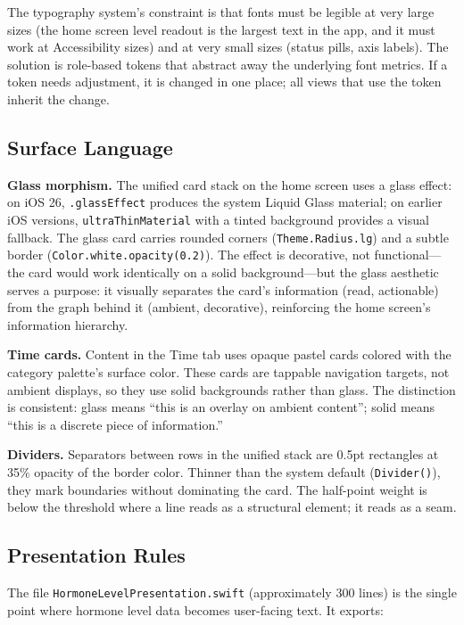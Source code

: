 \documentclass[11pt,a4paper]{article}
\newcommand{\code}[1]{\texttt{\small #1}}
\begin{document}
The typography system's constraint is that fonts must be legible at very
large sizes (the home screen level readout is the largest text in the
app, and it must work at Accessibility sizes) and at very small sizes
(status pills, axis labels). The solution is role-based tokens that
abstract away the underlying font metrics. If a token needs adjustment, it
is changed in one place; all views that use the token inherit the change.

\subsection{Surface Language}
\label{sec:surfaces}

\textbf{Glass morphism.} The unified card stack on the home screen uses a
glass effect: on iOS 26, \code{.glassEffect} produces the system Liquid
Glass material; on earlier iOS versions, \code{ultraThinMaterial} with a
tinted background provides a visual fallback. The glass card carries
rounded corners (\code{Theme.Radius.lg}) and a subtle border
(\code{Color.white.opacity(0.2)}). The effect is decorative, not
functional---the card would work identically on a solid background---but
the glass aesthetic serves a purpose: it visually separates the card's
information (read, actionable) from the graph behind it (ambient,
decorative), reinforcing the home screen's information hierarchy.

\textbf{Time cards.} Content in the Time tab uses opaque pastel cards
colored with the category palette's surface color. These cards are
tappable navigation targets, not ambient displays, so they use solid
backgrounds rather than glass. The distinction is consistent: glass means
``this is an overlay on ambient content''; solid means ``this is a
discrete piece of information.''

\textbf{Dividers.} Separators between rows in the unified stack are
0.5pt rectangles at 35\% opacity of the border color. Thinner than the
system default (\code{Divider()}), they mark boundaries without
dominating the card. The half-point weight is below the threshold where a
line reads as a structural element; it reads as a seam.

\subsection{Presentation Rules}
\label{sec:presentation_rules}

The file \code{HormoneLevelPresentation.swift} (approximately 300 lines)
is the single point where hormone level data becomes user-facing text. It
exports:
\end{document}

